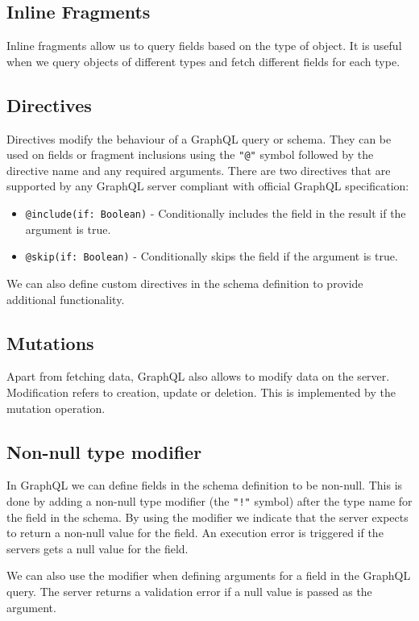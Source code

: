 \subsection{Inline Fragments}
Inline fragments allow us to query fields based on the type of object. It is useful when we query objects of different types and fetch different fields for each type.

\subsection{Directives}
Directives modify the behaviour of a GraphQL query or schema. They can be used on fields or fragment inclusions using the \texttt{"@"} symbol followed by the directive name and any required arguments. There are two directives that are supported by any GraphQL server compliant with official GraphQL specification:

\begin{itemize}
\item \texttt{@include(if: Boolean)} -  Conditionally includes the field in the result if the argument is true.
\item \texttt{@skip(if: Boolean)} -  Conditionally skips the field if the argument is true.
\end{itemize}

We can also define custom directives in the schema definition to provide additional functionality.

\subsection{Mutations}
Apart from fetching data, GraphQL also allows to modify data on the server. Modification refers to creation, update or deletion. This is implemented by the mutation operation. 

\subsection{Non-null type modifier}
In GraphQL we can define fields in the schema definition to be non-null. This is done by adding a non-null type modifier (the \texttt{"!"} symbol) after the type name for the field in the schema. By using the modifier we indicate that the server expects to return a non-null value for the field. An execution error is triggered if the servers gets a null value for the field. 

We can also use the modifier when defining arguments for a field in the GraphQL query. The server returns a validation error if a null value is passed as the argument. 

